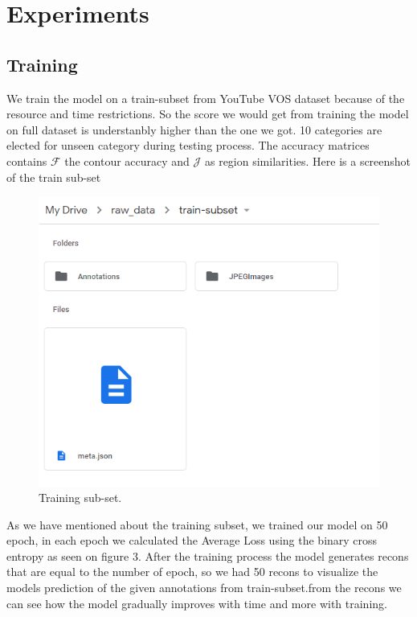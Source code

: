 \documentclass[conference]{IEEEtran}
\begin{document}
\vspace*{.5cm}
\section{Experiments}
\subsection{Training}
We train the model on a train-subset from YouTube VOS dataset because of the resource and time restrictions. So the score we would get from training the model on full dataset is understanbly higher than the one we got. 10 categories are elected for unseen category during testing process. The accuracy matrices contains $\mathcal{F}$ the contour accuracy and $\mathcal{J}$ as region similarities.
\newline
Here is a screenshot of the train sub-set
\begin{figure}[h!]
\centering
\includegraphics[scale=.6]{train sub.png}
\caption{Training sub-set.}
\label{fig:Training sub-set}
\end{figure}
As we have mentioned about the training subset, we trained our model on 50 epoch, in each epoch we calculated the Average Loss using the binary cross entropy as seen on figure 3. After the training process the model generates recons that are equal to the number of epoch, so we had 50 recons to visualize the models prediction of the given annotations from train-subset.from the recons we can see how the model gradually improves with time and more with training. 
\end{document}
